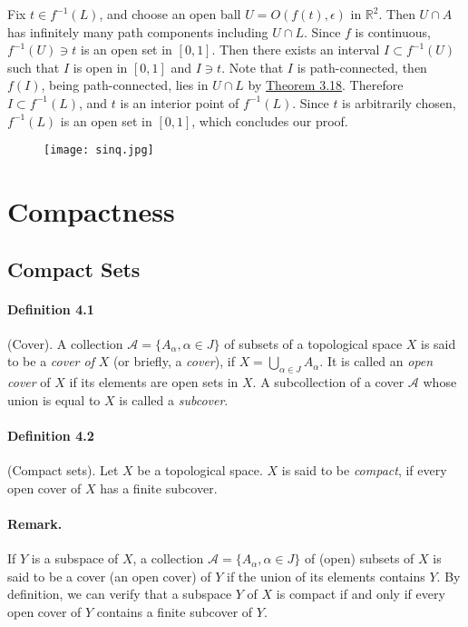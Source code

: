 \documentclass{article}
\numberwithin{equation}{section}
\theoremstyle{plain}
\theoremstyle{definition}
\begin{document}
Fix $t\in f^{-1}(L)$, and choose an open ball $U=O(f(t),\epsilon)$ in $\mathbb{R}^2$. Then $U\cap A$ has infinitely many path components including $U\cap L$. Since $f$ is continuous, $f^{-1}(U)\ni t$ is an open set in $[0,1]$. Then there exists an interval $I\subset f^{-1}(U)$ such that $I$ is open in $[0,1]$ and $I\ni t$. Note that $I$ is path-connected, then $f(I)$, being path-connected, lies in $U\cap L$ by \hyperref[thm:3.18]{Theorem 3.18}. Therefore $I\subset f^{-1}(L)$, and $t$ is an interior point of $f^{-1}(L)$. Since $t$ is arbitrarily chosen, $f^{-1}(L)$ is an open set in $[0,1]$, which concludes our proof.

\begin{figure}[H]
\centering
\texttt{[image: sinq.jpg]}
\end{figure}

\newpage
\section{Compactness}
\subsection{Compact Sets}
\paragraph{Definition 4.1\label{def:4.1}} (Cover). A collection $\mathscr{A} = \{A_\alpha,\alpha\in J\}$ of subsets of a topological space $X$ is said to be a \textit{cover of} $X$ (or briefly, a \textit{cover}), if $X=\bigcup_{\alpha\in J}A_\alpha$. It is called an \textit{open cover} of $X$ if its elements are open sets in $X$. A subcollection of a cover $\mathscr{A}$ whose union is equal to $X$ is called a \textit{subcover}.

\paragraph{Definition 4.2\label{def:4.2}} (Compact sets). Let $X$ be a topological space. $X$ is said to be \textit{compact}, if every open cover of $X$ has a finite subcover.

\paragraph{Remark.} If $Y$ is a subspace of $X$, a collection $\mathscr{A}=\{A_\alpha,\alpha\in J\}$ of (open) subsets of $X$ is said to be a cover (an open cover) of $Y$ if the union of its elements contains $Y$. By definition, we can verify that a subspace $Y$ of $X$ is compact if and only if every open cover of $Y$ contains a finite subcover of $Y$.
\end{document}

